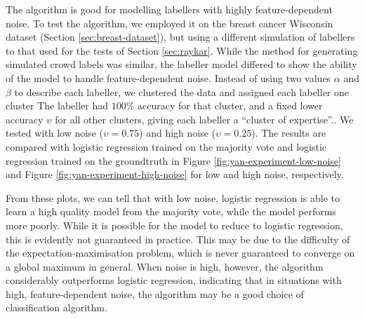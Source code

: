         The \citeauthor{yan10} algorithm is good for modelling labellers with
        highly feature-dependent noise. To test the algorithm, we employed it on
        the breast cancer Wisconsin dataset (Section \ref{sec:breast-dataset}),
        but using a different simulation of labellers to that used for the
        \citeauthor{raykar10} tests of Section \ref{sec:raykar}. While the
        method for generating simulated crowd labels was similar, the labeller
        model differed to show the ability of the \citeauthor{yan10} model to
        handle feature-dependent noise. Instead of using two values $\alpha$ and
        $\beta$ to describe each labeller, we clustered the data and assigned
        each labeller one cluster The labeller had $100\%$ accuracy for that
        cluster, and a fixed lower accuracy $\upsilon$ for all other clusters,
        giving each labeller a ``cluster of expertise''.. We tested with low
        noise ($\upsilon = 0.75$) and high noise ($\upsilon = 0.25$). The
        results are compared with logistic regression trained on the majority
        vote and logistic regression trained on the groundtruth in Figure
        \ref{fig:yan-experiment-low-noise} and Figure
        \ref{fig:yan-experiment-high-noise} for low and high noise,
        respectively.

        From these plots, we can tell that with low noise, logistic regression
        is able to learn a high quality model from the majority vote, while the
        \citeauthor{yan10} model performs more poorly. While it is possible for
        the \citeauthor{yan10} model to reduce to logistic regression, this is
        evidently not guaranteed in practice. This may be due to the difficulty
        of the expectation-maximisation problem, which is never guaranteed to
        converge on a global maximum in general. When noise is high, however,
        the \citeauthor{yan10} algorithm considerably outperforms logistic
        regression, indicating that in situations with high, feature-dependent
        noise, the \citeauthor{yan10} algorithm may be a good choice of
        classification algorithm.

